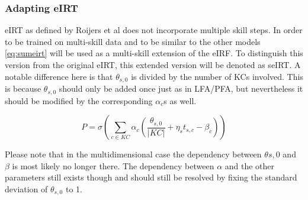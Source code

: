 \documentclass{scrartcl}
\providecommand{\comm}[1]{{\bf[ #1 ]}}
\providecommand{\commd}[1]{\comm{D: {#1}}}
\begin{document}
\subsubsection{Adapting eIRT}
eIRT as defined by Roijers et al does not incorporate multiple skill steps. In order to be trained on multi-skill data and to be similar to the other models \ref{eq:sumeirt} will be used as a multi-skill extension of the eIRF. To distinguish this version from the original eIRT, this extended version will be denoted as seIRT. A notable difference here is that $\theta_{s,0}$ is divided by the number of KCs involved. This is because $\theta_{s,0}$ should only be added once just as in LFA/PFA, but nevertheless it should be modified by the corresponding $\alpha_{c}$s as well.

\begin{equation}
\label{eq:sumeirt}
P = \sigma(\sum_{c \in KC} \alpha_{c}(\frac{\theta_{s,0}}{|KC|} + \eta_{s} t_{s,c} - \beta_{c}))
\end{equation}

Please note that in the multidimensional case the dependency between $\theta{s,0}$ and $\beta$ is most likely no longer there. The dependency between $\alpha$ and the other parameters still exists though and should still be resolved by fixing the standard deviation of $\theta_{s,0}$ to 1.

\begin{comment}
In comparing seIRT's (or eIRT's) parameter values to those of LFA $\beta$ should be multiplied by $\alpha$. $\theta$ is to be multiplied by a weighted average of $\alpha$ (according to the ratio of KCs of the questions that the corresponding student has answered). Finally a weighted average of $\eta$ per KC should be taken according to the ratio of questions each student has answered containing that KC. seIRT can be compared to PFA by combining the steps above with the steps needed to compare PFA to LFA.

\commd{Let's discuss this: $\eta_s$ is constant per student, and alpha should be inside the sum if you want ot avg it. }


\begin{mycapequ}[!ht]
\begin{equation}
\begin{aligned}
    \beta_{c}:  &  \alpha_{c}*\beta_{c} \\
    \eta_{c}:  &  \alpha_{c}*\frac{\sum_{s \in S} \eta_{s}*t_{s,c}} {|t_{c}|} \\
    \theta_{s,0}: & \theta_{s,0}*\frac {\sum_{c \in KC} \alpha_{c}*t_{s,c}} {|t_{s}|}
\end{aligned}
\end{equation}
\caption{Comparison of LFA parameters to seIRT parameters}
\end{mycapequ}
\end{comment}
\end{document}
